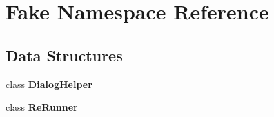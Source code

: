 \section{Fake Namespace Reference}
\label{namespace_fake}
\subsection*{Data Structures}
\begin{DoxyCompactItemize}
\item 
class {\bf Dialog\+Helper}
\item 
class {\bf Re\+Runner}
\end{DoxyCompactItemize}
